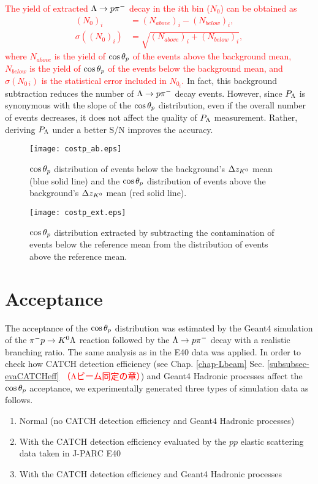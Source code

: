\textcolor{red}{The yield of extracted $\Lambda\to p\pi^{-}$ decay in the $i$th bin ($N_0$) can be obtained as
\begin{align}
  (N_{0})_i &= (N_{above})_i - (N_{below})_i, \\
  \sigma((N_{0})_i) &= \sqrt{(N_{above})_i + (N_{below})_i},
\end{align}
where $N_{above}$ is the yield of $\cos{\theta_p}$ of the events above the background mean, $N_{below}$ is the yield of $\cos{\theta_p}$ of the events below the background mean, and $\sigma(N_{0\ i})$ is the statistical error included in $N_{0_i}$. } In fact, this background subtraction reduces the number of $\Lambda\to p\pi^{-}$ decay events. However, since $P_{\Lambda}$ is synonymous with the slope of the $\cos{\theta_p}$ distribution, even if the overall number of events decreases, it does not affect the quality of $P_{\Lambda}$ measurement. Rather, deriving $P_{\Lambda}$ under a better S/N improves the accuracy.

\begin{figure}[h]
  \centering
  \texttt{[image: costp\_ab.eps]}
  \caption{$\cos{\theta_p}$ distribution of events below the background's $\Delta z_{K^{0}}$ mean (blue solid line) and the $\cos{\theta_p}$ distribution of events above the background's $\Delta z_{K^{0}}$ mean (red solid line).}
  \label{fig-costp_ab}
\end{figure}

\begin{figure}[h]
  \centering
  \texttt{[image: costp\_ext.eps]}
  \caption{$\cos{\theta_p}$ distribution extracted by subtracting the contamination of events below the reference mean from the distribution of events above the reference mean.}
  \label{fig-costp_ext}
\end{figure}


\clearpage
\section{Acceptance}
\label{sec-accPl}

The acceptance of the $\cos{\theta_p}$ distribution was estimated by the Geant4 simulation of the $\pi^- p \to K^0 \Lambda$ reaction followed by the $\Lambda\to p\pi^{-}$ decay with a realistic branching ratio. The same analysis as in the E40 data was applied. In order to check how CATCH detection efficiency (see Chap. \ref{chap-Lbeam} Sec. \ref{subsubsec-evaCATCHeff} \textcolor{red}{（Λビーム同定の章）}) and Geant4 Hadronic processes affect the $\cos{\theta_p}$ acceptance, we experimentally generated three types of simulation data as follows.
\begin{enumerate}
  \item Normal (no CATCH detection efficiency and Geant4 Hadronic processes)
  \item With the CATCH detection efficiency evaluated by the $pp$ elastic scattering data taken in J-PARC E40
  \item With the CATCH detection efficiency and Geant4 Hadronic processes
  \label{list-threetypes}
\end{enumerate}

